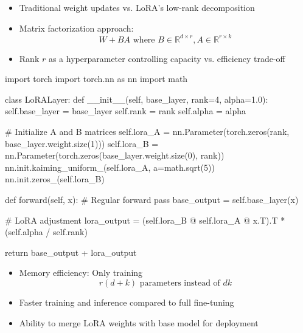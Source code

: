 \begin{itemize}
    \item Traditional weight updates vs. LoRA's low-rank decomposition
    \item Matrix factorization approach: 
    \begin{equation}\label{eq:lora_decomp}
    W + BA \text{ where } B \in \mathbb{R}^{d \times r}, A \in \mathbb{R}^{r \times k}
    \end{equation}
    \item Rank $r$ as a hyperparameter controlling capacity vs. efficiency trade-off
\end{itemize}

\begin{pythoncode}
import torch
import torch.nn as nn
import math

class LoRALayer:
    def __init__(self, base_layer, rank=4, alpha=1.0):
        self.base_layer = base_layer
        self.rank = rank
        self.alpha = alpha
        
        # Initialize A and B matrices
        self.lora_A = nn.Parameter(torch.zeros(rank, base_layer.weight.size(1)))
        self.lora_B = nn.Parameter(torch.zeros(base_layer.weight.size(0), rank))
        nn.init.kaiming_uniform_(self.lora_A, a=math.sqrt(5))
        nn.init.zeros_(self.lora_B)
        
    def forward(self, x):
        # Regular forward pass
        base_output = self.base_layer(x)
        
        # LoRA adjustment
        lora_output = (self.lora_B @ self.lora_A @ x.T).T * (self.alpha / self.rank)
        
        return base_output + lora_output
\end{pythoncode}

\begin{itemize}
    \item Memory efficiency: Only training 
    \begin{equation}\label{eq:lora_params}
    r(d + k) \text{ parameters instead of } dk
    \end{equation}
    \item Faster training and inference compared to full fine-tuning
    \item Ability to merge LoRA weights with base model for deployment
\end{itemize}

